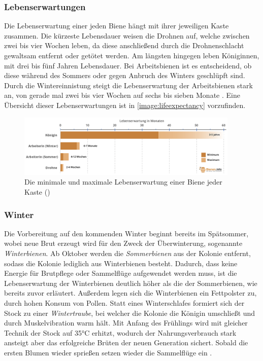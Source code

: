 \subsubsection{Lebenserwartungen}
Die Lebenserwartung einer jeden Biene hängt mit ihrer jeweiligen Kaste zusammen. Die kürzeste Lebensdauer weisen die Drohnen auf, welche zwischen zwei bis vier Wochen leben, da diese anschließend durch die Drohnenschlacht gewaltsam entfernt oder getötet werden. Am längsten hingegen leben Königinnen, mit drei bis fünf Jahren Lebensdauer. Bei Arbeitsbienen ist es entscheidend, ob diese während des Sommers oder gegen Anbruch des Winters geschlüpft sind. Durch die Wintereinnistung steigt die Lebenserwartung der Arbeitsbienen stark an, von gerade mal zwei bis vier Wochen auf sechs bis sieben Monate \cite*[]{bees:lifeexpectancy}. Eine Übersicht dieser Lebenserwartungen ist in \autoref{image:lifeexpectancy} vorzufinden.

\begin{figure}
    \begin{center}
        \includegraphics[width=400px]{0.bilder/lifeexpectancy.png}
    \end{center}
    \caption{Die minimale und maximale Lebenserwartung einer Biene jeder Kaste (\cite[]{bees:lifeexpectancy})} \label{image:lifeexpectancy}
\end{figure}

\subsubsection{Winter}
Die Vorbereitung auf den kommenden Winter beginnt bereits im Spätsommer, wobei neue Brut erzeugt wird für den Zweck der Überwinterung, sogenannte \textit{Winterbienen}. Ab Oktober werden die \textit{Sommerbienen} aus der Kolonie entfernt, sodass die Kolonie lediglich aus Winterbienen besteht. Dadurch, dass keine Energie für Brutpflege oder Sammelflüge aufgewendet werden muss, ist die Lebenserwartung der Winterbienen deutlich höher als die der Sommerbienen, wie bereits zuvor erläutert. Außerdem legen sich die Winterbienen ein Fettpolster zu, durch hohen Konsum von Pollen. Statt eines Winterschlafes formiert sich der Stock zu einer \textit{Wintertraube}, bei welcher die Kolonie die Königin umschließt und durch Muskelvibration warm hält. Mit Anfang des Frühlings wird mit gleicher Technik der Stock auf 35°C erhitzt, wodurch der Nahrungsverbrauch stark ansteigt aber das erfolgreiche Brüten der neuen Generation sichert. Sobald die ersten Blumen wieder sprießen setzen wieder die Sammelflüge ein \cite*[]{bees:winter}.